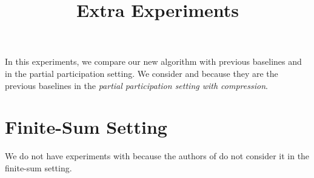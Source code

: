 \documentclass{article}
\title{Extra Experiments}
\begin{document}
\maketitle

In this experiments, we compare our new algorithm  with previous baselines  and  in the partial participation setting. We consider  and  because they are the previous baselines in the \emph{partial participation setting with compression}.
\section*{Finite-Sum Setting}
We do not have experiments with  because the authors of  do not consider it in the finite-sum setting.
\end{document}
